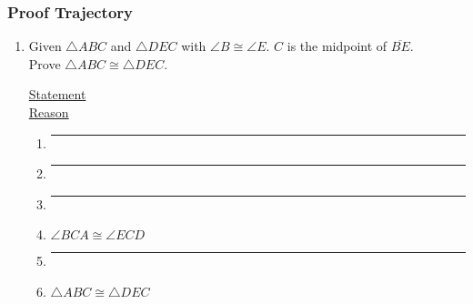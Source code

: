 

\fancyhead[LE]{\thepage}



\subsubsection*{Proof Trajectory}
\begin{enumerate}
\item Given $\triangle ABC$ and $\triangle DEC$ with $\angle B \cong \angle E$. $C$ is the midpoint of $\overline{BE}$.\\ Prove $\triangle ABC \cong \triangle DEC$.\\[0.5cm]
 \begin{multicols}{2}
   \underline{Statement} \\
   \underline{Reason}
 \end{multicols}
 \begin{multicols}{2}
   \raggedcolumns
   \begin{enumerate}[label={\arabic*)}]
     \item \rule{4cm}{0.15mm} \vspace{0.3cm}
     \item \rule{4cm}{0.15mm} \vspace{0.3cm}
     \item \rule{4cm}{0.15mm} \vspace{0.3cm}
     \item $\angle BCA \cong \angle ECD$  \vspace{0.3cm}
     \item \rule{4cm}{0.15mm} \vspace{0.3cm}
     \item $\triangle ABC \cong \triangle DEC$ \vspace{0.3cm}
   \end{enumerate}
   \begin{enumerate}[label={\arabic*)}]

\end{enumerate}
\end{multicols}
\end{enumerate}
